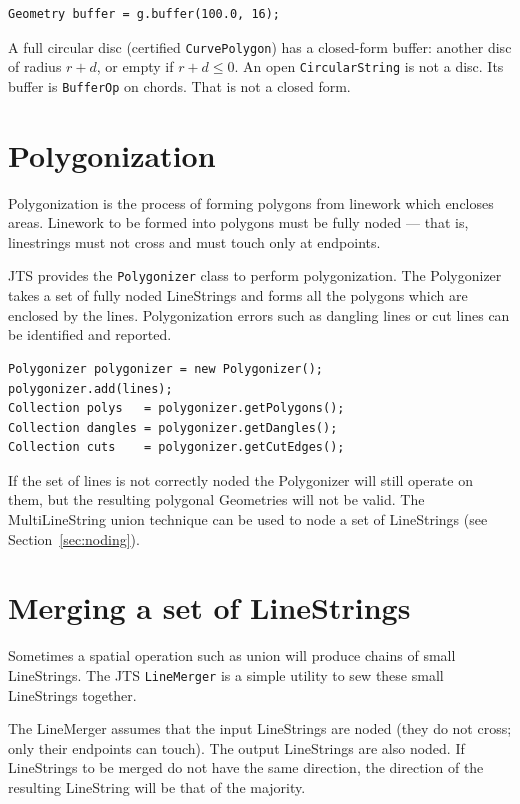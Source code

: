 \documentclass[11pt]{article}
\begin{document}
\begin{lstlisting}
Geometry buffer = g.buffer(100.0, 16);
\end{lstlisting}

\begin{amendment}
A full circular disc (certified \texttt{CurvePolygon}) has a
closed-form buffer: another disc of radius $r+d$, or empty if
$r+d \le 0$. An open \texttt{CircularString} is not a disc. Its
buffer is \texttt{BufferOp} on chords. That is not a closed form.
\end{amendment}

\section{Polygonization}
Polygonization is the process of forming polygons from linework which
encloses areas. Linework to be formed into polygons must be fully
noded --- that is, linestrings must not cross and must touch only at
endpoints.

JTS provides the \texttt{Polygonizer} class to perform
polygonization. The Polygonizer takes a set of fully noded
LineStrings and forms all the polygons which are enclosed by the
lines. Polygonization errors such as dangling lines or cut lines can
be identified and reported.

\begin{lstlisting}
Polygonizer polygonizer = new Polygonizer();
polygonizer.add(lines);
Collection polys   = polygonizer.getPolygons();
Collection dangles = polygonizer.getDangles();
Collection cuts    = polygonizer.getCutEdges();
\end{lstlisting}

If the set of lines is not correctly noded the Polygonizer will still
operate on them, but the resulting polygonal Geometries will not be
valid. The MultiLineString union technique can be used to node a set
of LineStrings (see Section~\ref{sec:noding}).

\section{Merging a set of LineStrings}
Sometimes a spatial operation such as union will produce chains of
small LineStrings. The JTS \texttt{LineMerger} is a simple utility to
sew these small LineStrings together.

The LineMerger assumes that the input LineStrings are noded (they do
not cross; only their endpoints can touch). The output LineStrings
are also noded. If LineStrings to be merged do not have the same
direction, the direction of the resulting LineString will be that of
the majority.
\end{document}
